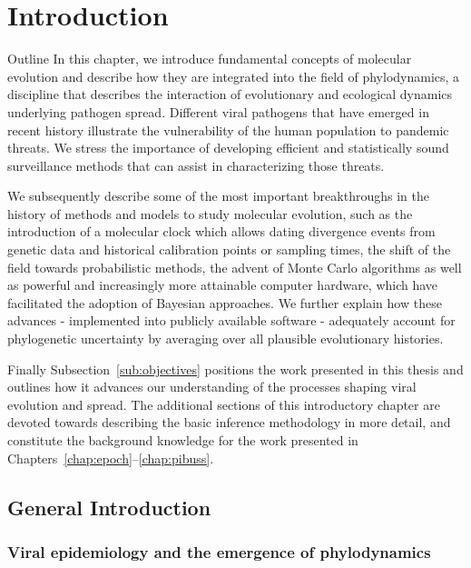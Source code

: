 \chapter{Introduction\label{chap:intro}}

\begin{remark}{Outline}
In this chapter, we introduce fundamental concepts of molecular evolution and describe how they are integrated into the field of phylodynamics, a discipline that describes the interaction of evolutionary and ecological dynamics underlying pathogen spread.
Different viral pathogens that have emerged in recent history illustrate the vulnerability of the human population to pandemic threats.
We stress the importance of developing efficient and statistically sound surveillance methods that can assist in characterizing those threats.

We subsequently describe some of the most important breakthroughs in the history of methods and models to study molecular evolution, such as the introduction of a molecular clock which allows dating divergence events from genetic data and historical calibration points or sampling times, the shift of the field towards probabilistic methods, the advent of Monte Carlo algorithms as well as powerful and increasingly more attainable computer hardware, which have facilitated the adoption of Bayesian approaches.
We further explain how these advances - implemented into publicly available software - adequately account for phylogenetic uncertainty by averaging over all plausible evolutionary histories.

Finally Subsection~\ref{sub:objectives} positions the work presented in this thesis and outlines how it advances our understanding of the processes shaping viral evolution and spread.
The additional sections of this introductory chapter are devoted towards describing the basic inference methodology in more detail, and constitute the background knowledge for the work presented in Chapters~\ref{chap:epoch}--\ref{chap:pibuss}.
\end{remark}

\section{General Introduction\label{sub:general}}

\subsection{Viral epidemiology and the emergence of phylodynamics\label{sub:epidemiology}}

